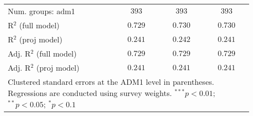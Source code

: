 \begin{table}[htbp]
\begin{center}
\begin{tabular}{l c c c}
Num. groups: adm1                                         & $393$          & $393$          & $393$          \\
R$^2$ (full model)                                        & $0.729$        & $0.730$        & $0.730$        \\
R$^2$ (proj model)                                        & $0.241$        & $0.242$        & $0.241$        \\
Adj. R$^2$ (full model)                                   & $0.729$        & $0.729$        & $0.729$        \\
Adj. R$^2$ (proj model)                                   & $0.241$        & $0.241$        & $0.241$        \\
\hline
\multicolumn{4}{l}{\scriptsize{Clustered standard errors at the ADM1 level in parentheses. Regressions are conducted using survey weights. $^{***}p<0.01$; $^{**}p<0.05$; $^{*}p<0.1$}}
\end{tabular}
\label{main: table4}
\end{center}
\end{table}
